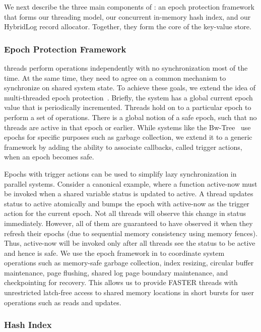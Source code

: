 {\color{blue}

We next describe the three main components of \faster: an epoch
protection framework that forms our threading model, our concurrent
in-memory hash index, and our HybridLog record allocator.
%
Together, they form the core of the \faster key-value store.

\subsubsection{Epoch Protection Framework}
\label{sec:epochs}

\faster threads perform operations independently with no synchronization
most of the time.
%
At the same time, they need to agree on a common mechanism to
synchronize on shared system state.
%
To achieve these goals, we extend the idea of multi-threaded epoch
protection~\cite{kung}.
%
Briefly, the system has a global current epoch value that is
periodically incremented.
%
Threads hold on to a particular epoch to perform a set of operations.
%
There is a global notion of a safe epoch, such that no threads are
active in that epoch or earlier.
%
While systems like the Bw-Tree~\cite{bwtree} use epochs for specific
purposes such as garbage collection, we extend it to a generic framework
by adding the ability to associate callbacks, called trigger actions,
when an epoch becomes safe.

Epochs with trigger actions can be used to simplify lazy synchronization
in parallel systems.
%
Consider a canonical example, where a function active-now must be
invoked when a shared variable status is updated to active.
%
A thread updates status to active atomically and bumps the epoch with
active-now as the trigger action for the current epoch.
%
Not all threads will observe this change in status immediately.
%
However, all of them are guaranteed to have observed it when they
refresh their epochs (due to sequential memory consistency using
memory fences).
%
Thus, active-now will be invoked only after all threads see the status
to be active and hence is safe.
%
We use the epoch framework in \faster to coordinate system operations
such as memory-safe garbage collection, index resizing, circular buffer
maintenance, page flushing, shared log page boundary maintenance, and
checkpointing for recovery.
%
This allows us to provide FASTER threads with unrestricted latch-free
access to shared memory locations in short bursts for user operations
such as reads and updates.

\subsubsection{Hash Index}

}
